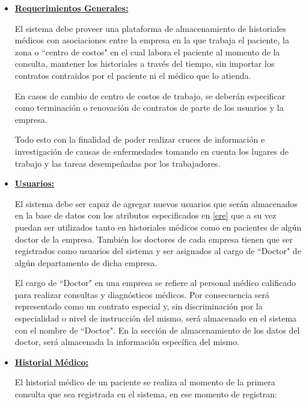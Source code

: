     \begin{itemize}
        \item \textbf{\underline{Requerimientos Generales:}}
        
        El sistema debe proveer una plataforma de almacenamiento de historiales médicos con asociaciones entre la empresa en la que trabaja el paciente, la zona o ``centro de costos" en el cual labora el paciente al momento de la consulta, mantener los historiales a través del tiempo, sin importar los contratos contraidos por el paciente ni el médico que lo atienda.
        
        En casos de cambio de centro de costos de trabajo, se deberán especificar como terminación o renovación de contratos de parte de los usuarios y la empresa.
        
        Todo esto con la finalidad de poder realizar cruces de información e investigación de causas de enfermedades tomando en cuenta los lugares de trabajo y las tareas desempeñadas por los trabajadores.
        
        \item \textbf{\underline{Usuarios:}}
        
        El sistema debe ser capaz de agregar nuevos usuarios que serán almacenados en la base de datos con los atributos especificados en \ref{ere} que a su vez puedan ser utilizados tanto en historiales médicos como en pacientes de algún doctor de la empresa. También los doctores de cada empresa tienen que ser registrados como usuarios del sistema y ser asignados al cargo de ``Doctor" de algún departamento de dicha empresa.
        
        El cargo de ``Doctor" en una empresa se refiere al personal médico calificado para realizar consultas y diagnósticos médicos. Por consecuencia será representado como un contrato especial y, sin discriminación por la especialidad o nivel de instrucción del mismo, será almacenado en el sistema con el nombre de ``Doctor". En la sección de almacenamiento de los datos del doctor, será  almacenada la información específica del mismo.
        
        \item \textbf{\underline{Historial Médico:}}
        
        El historial médico de un paciente se realiza al momento de la primera consulta que sea registrada en el sistema, en ese momento de registran:
        

\end{itemize}
